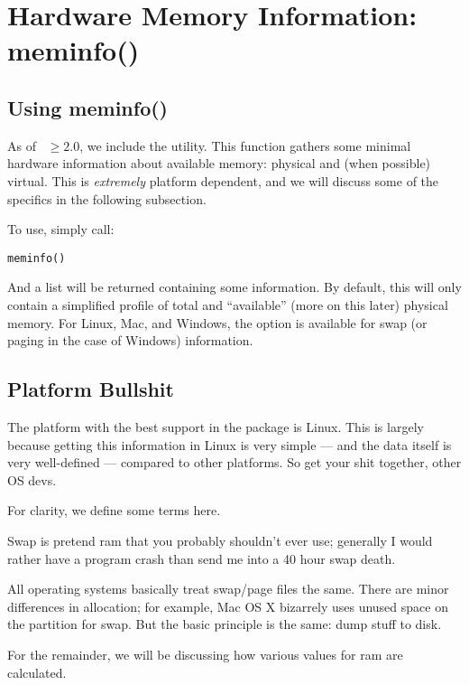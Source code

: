 \section{Hardware Memory Information: meminfo()}

\subsection{Using meminfo()}

As of ~$\geq 2.0$, we include the  utility.  This function gathers some minimal hardware information about available memory: physical and (when possible) virtual.  This is \emph{extremely} platform dependent, and we will discuss some of the specifics in the following subsection.  

To use, simply call:
\begin{lstlisting}
meminfo()
\end{lstlisting}

And a list will be returned containing some information.  By default, this will only contain a simplified profile of total and ``available'' (more on this later) physical memory.  For Linux, Mac, and Windows, the option is available for swap (or paging in the case of Windows) information.  




\subsection{Platform Bullshit}

The platform with the best support in the  package is Linux.  This is largely because getting this information in Linux is very simple --- and the data itself is very well-defined --- compared to other platforms.  So get your shit together, other OS devs.

For clarity, we define some terms here.

Swap is pretend ram that you probably shouldn't ever use; generally I would rather have a program crash than send me into a 40 hour swap death.

All operating systems basically treat swap/page files the same.  There are minor differences in allocation; for example, Mac OS X bizarrely uses unused space on the  partition for swap.  But the basic principle is the same: dump stuff to disk.

For the remainder, we will be discussing how various values for ram are calculated.




